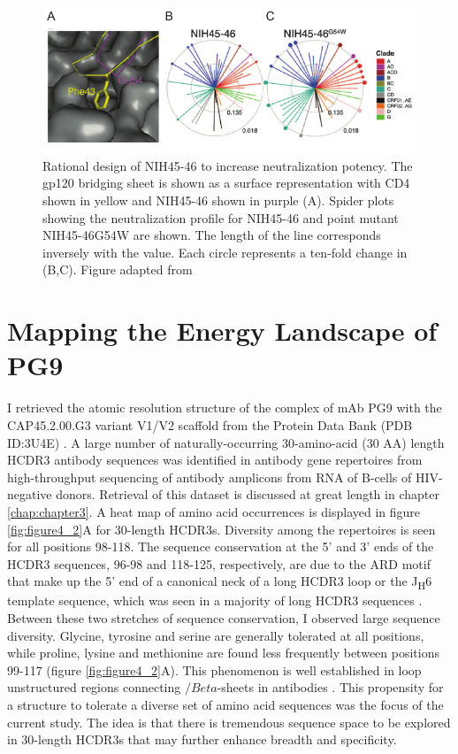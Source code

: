 \begin{figure}
   \centering
   \includegraphics{images/chapter4/figure4_1.pdf} %
   \caption[Rational Design of NIH45-46 to Increase Neutralization Potency]{Rational design of NIH45-46 to increase neutralization potency. The gp120 bridging sheet is shown as a surface representation with CD4 shown in yellow and NIH45-46 shown in purple (A). Spider plots showing the neutralization profile for NIH45-46 and point mutant NIH45-46G54W are shown. The length of the line corresponds inversely with the \ic value. Each circle represents a ten-fold change in \ic (B,C). Figure adapted from \citep{Diskin:2011hl}}
   \label{fig:figure4_1}
\end{figure}

\section{Mapping the Energy Landscape of PG9}
\label{sec:mapping}
I retrieved the atomic resolution structure of the complex of mAb PG9 with the CAP45.2.00.G3 variant V1/V2 scaffold from the Protein Data Bank (PDB ID:3U4E) \citep{McLellan:2011dg}. A large number of naturally-occurring 30-amino-acid (30 AA) length HCDR3 antibody sequences was identified in antibody gene repertoires from high-throughput sequencing of antibody amplicons from RNA of B-cells of HIV-negative donors. Retrieval of this dataset is discussed at great length in chapter \ref{chap:chapter3}. A heat map of amino acid occurrences is displayed in figure \ref{fig:figure4_2}A for 30-length HCDR3s. Diversity among the repertoires is seen for all positions 98-118. The sequence conservation at the 5' and 3' ends of the HCDR3 sequences, 96-98 and 118-125, respectively, are due to the ARD motif that make up the 5' end of a canonical neck of a long HCDR3 loop or the J\textsubscript{H}6 template sequence, which was seen in a majority of long HCDR3 sequences \citep{North:2011dv,Briney:2012ib}. Between these two stretches of sequence conservation, I observed large sequence diversity. Glycine, tyrosine and serine are generally tolerated at all positions, while proline, lysine and methionine are found less frequently between positions 99-117 (figure \ref{fig:figure4_2}A). This phenomenon is well established in loop unstructured regions connecting $/Beta$-sheets in antibodies \citep{Minuchehr:2005wc,De:2005in}.  This propensity for a structure to tolerate a diverse set of amino acid sequences was the focus of the current study. The idea is that there is tremendous sequence space to be explored in 30-length HCDR3s that may further enhance breadth and specificity.


